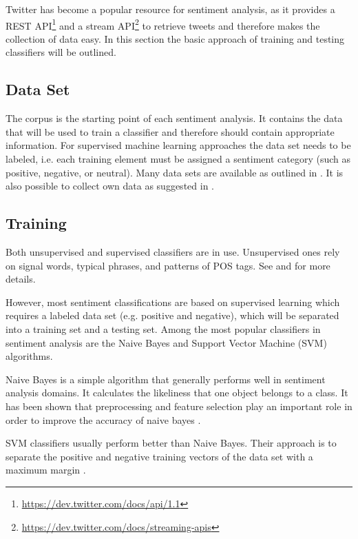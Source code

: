 \documentclass{acm_proc_article-sp}
\begin{document}
Twitter has become a
popular resource for sentiment analysis, as it provides a REST
API\footnote{\url{https://dev.twitter.com/docs/api/1.1}} and a stream
API\footnote{\url{https://dev.twitter.com/docs/streaming-apis}} to retrieve tweets
and therefore makes the collection of data easy.  In this section the basic
approach of training and testing classifiers will be outlined.


\subsection{Data Set}

The corpus is the starting point of each sentiment
analysis. It contains the data that will be used to train a classifier and
therefore should contain appropriate information. %
For supervised machine
learning approaches the data set needs to be labeled, i.e. each training element
must be assigned a sentiment category (such as positive, negative, or neutral).
Many data sets are available as outlined in \cite{kouloumpis2011twitter}. It is also
possible to collect own data as suggested in \cite{pak2010twitter}.


\subsection{Training}

Both unsupervised and
supervised classifiers are in use. Unsupervised ones rely on signal words, typical
phrases, and patterns of POS tags. See
\cite{liu2010sentimentanalysis} and \cite{pang2008opinion} for more details.

However, most sentiment classifications are based on supervised learning which
requires a labeled data set (e.g. positive and negative), which will be
separated into a training set and a testing set. Among the most popular
classifiers in sentiment analysis are the Naive Bayes and Support Vector Machine (SVM) algorithms. 

Naive Bayes is a simple algorithm that generally performs well in sentiment
analysis domains. It calculates the likeliness that one object belongs to a
class. It has been shown that preprocessing and feature selection play an
important role in order to improve the accuracy of naive bayes \cite{ye2009sentiment, ting2011naive}.

SVM classifiers usually perform better than Naive Bayes.
Their approach is to separate the
positive and negative training vectors of the data set with a maximum margin
\cite{ye2009sentiment}.
\end{document}
